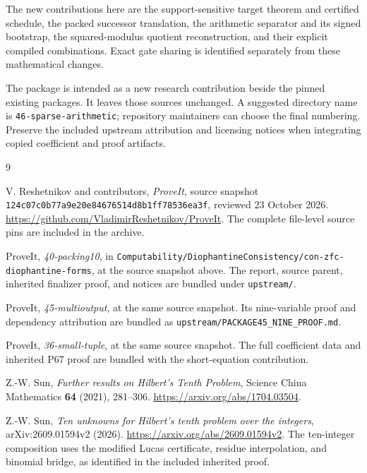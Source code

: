 \documentclass[11pt,letterpaper]{article}
\theoremstyle{remark}\newtheorem{remark}[theorem]{Remark}
\newcommand{\file}[1]{\nolinkurl{#1}}
\begin{document}
The new contributions here are the support-sensitive target theorem and
certified schedule, the packed successor translation, the arithmetic
separator and its signed bootstrap, the squared-modulus quotient
reconstruction, and their explicit compiled combinations.
Exact gate sharing is identified separately from these mathematical changes.

The package is intended as a new research contribution beside the pinned
existing packages. It leaves those sources unchanged. A suggested directory
name is \file{46-sparse-arithmetic}; repository maintainers can choose the
final numbering. Preserve the included upstream attribution and licensing
notices when integrating copied coefficient and proof artifacts.

{}
\begin{thebibliography}{9}
\raggedright
{}
V. Reshetnikov and contributors,
\emph{ProveIt}, source snapshot
\texttt{124c07c0b77a9e20e84676514d8b1ff78536ea3f},
reviewed 23 October 2026.
\url{https://github.com/VladimirReshetnikov/ProveIt}.
The complete file-level source pins are included in the archive.

ProveIt, \emph{40-packing10}, in
\file{Computability/DiophantineConsistency/con-zfc-diophantine-forms},
at the source snapshot above.
The report, source parent, inherited finalizer proof, and notices
are bundled under \file{upstream/}.

ProveIt, \emph{45-multioutput}, at the same source snapshot.
Its nine-variable proof and dependency attribution are bundled as
\file{upstream/PACKAGE45_NINE_PROOF.md}.

ProveIt, \emph{36-small-tuple}, at the same source snapshot.
The full coefficient data and inherited P67 proof are bundled with
the short-equation contribution.

Z.-W. Sun, \emph{Further results on Hilbert's Tenth Problem},
Science China Mathematics \textbf{64} (2021), 281--306.
\url{https://arxiv.org/abs/1704.03504}.

Z.-W. Sun, \emph{Ten unknowns for Hilbert's tenth problem over the integers},
arXiv:2609.01594v2 (2026).
\url{https://arxiv.org/abs/2609.01594v2}.
The ten-integer composition uses the modified Lucas certificate,
residue interpolation, and binomial bridge, as identified in the
included inherited proof.
\end{thebibliography}
\end{document}
